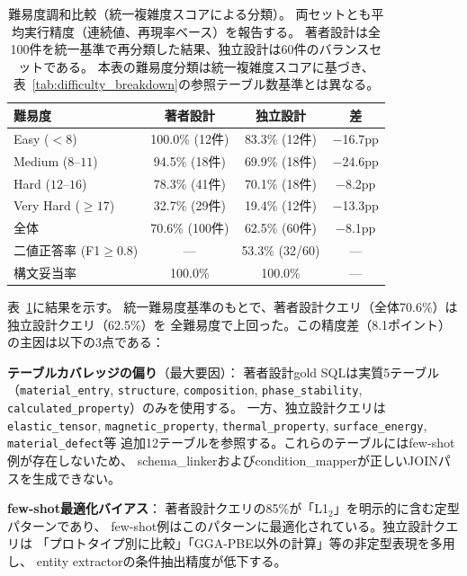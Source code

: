 \documentclass[5p,twocolumn]{elsarticle}
\begin{document}
\begin{table}[tbp]
  \centering
  \caption{難易度調和比較（統一複雑度スコアによる分類）。
  両セットとも平均実行精度（連続値、再現率ベース）を報告する。
  著者設計は全100件を統一基準で再分類した結果、独立設計は60件のバランスセットである。
  本表の難易度分類は統一複雑度スコアに基づき、表~\ref{tab:difficulty_breakdown}の参照テーブル数基準とは異なる。}
  \label{tab:independent_eval}
  \footnotesize
  \begin{tabular}{lccc}
    \toprule
    難易度 & 著者設計 & 独立設計 & 差 \\
    \midrule
    Easy ($< 8$)       & 100.0\% (12件) & 83.3\% (12件)  & $-$16.7pp \\
    Medium ($8$--$11$) &  94.5\% (18件) & 69.9\% (18件)  & $-$24.6pp \\
    Hard ($12$--$16$)  &  78.3\% (41件) & 70.1\% (18件)  & $-$8.2pp \\
    Very Hard ($\geq 17$) & 32.7\% (29件) & 19.4\% (12件) & $-$13.3pp \\
    \midrule
    全体               &  70.6\% (100件) & 62.5\% (60件) & $-$8.1pp \\
    二値正答率 (F1$\geq 0.8$) & --- & 53.3\% (32/60) & --- \\
    構文妥当率         & 100.0\% & 100.0\% & --- \\
    \bottomrule
  \end{tabular}
\end{table}

表~\ref{tab:independent_eval}に結果を示す。
統一難易度基準のもとで、著者設計クエリ（全体70.6\%）は独立設計クエリ（62.5\%）を
全難易度で上回った。この精度差（8.1ポイント）の主因は以下の3点である：

\textbf{テーブルカバレッジの偏り}（最大要因）：
著者設計gold SQLは実質5テーブル（\texttt{material\_entry}, \texttt{structure},
\texttt{composition}, \texttt{phase\_stability}, \texttt{calculated\_property}）のみを使用する。
一方、独立設計クエリは\texttt{elastic\_tensor}, \texttt{magnetic\_property},
\texttt{thermal\_property}, \texttt{surface\_energy}, \texttt{material\_defect}等
追加12テーブルを参照する。これらのテーブルにはfew-shot例が存在しないため、
schema\_linkerおよびcondition\_mapperが正しいJOINパスを生成できない。

\textbf{few-shot最適化バイアス}：
著者設計クエリの85\%が「L1$_2$」を明示的に含む定型パターンであり、
few-shot例はこのパターンに最適化されている。独立設計クエリは
「プロトタイプ別に比較」「GGA-PBE以外の計算」等の非定型表現を多用し、
entity extractorの条件抽出精度が低下する。
\end{document}
